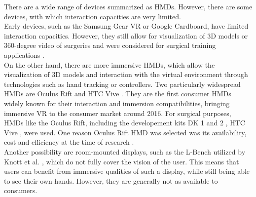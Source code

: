 There are a wide range of devices summarized as HMDs.
However, there are some devices, with which interaction capacities are very limited.
\\ Early devices, such as the Samsung Gear VR or Google Cardboard, have limited interaction capacities.
However, they still allow for visualization of 3D models or 360-degree video of surgeries and were considered for surgical training applications \cite{sararit2017vr, gomez2019techniques}.
\\ On the other hand, there are more immersive HMDs, which allow the visualization of 3D models and interaction with the virtual environment 
through technologies such as hand tracking or controllers.
Two particularly widespread HMDs are Oculus Rift \cite{OculusRift} and HTC Vive \cite{Vive}.
They are the first consumer HMDs widely known for their interaction and immersion compatibilities, bringing immersive VR to the consumer market around 2016.
For surgical purposes, HMDs like the Oculus Rift, including the developement kits DK 1 and 2 \cite{Parham.2019, Pulijala.2017,Sampogna.2017}, HTC 
Vive \cite{.2017, Barber.2020}, were used.
One reason Oculus Rift HMD was selected was its availability, cost and efficiency at the time of research \cite{Pulijala.2017}.
\\ Another possibility are room-mounted displays, such 
as the L-Bench utilized by Knott et al. \cite{RN69}, which do not fully
cover the vision of the user. This means that users can 
benefit from immersive qualities of such a display, while 
still being able to see their own hands. However,
they are generally not as available to consumers.